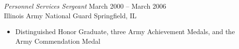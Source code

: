\documentclass[margin,line]{resume}
\begin{document}
\begin{resume}
{\sl Personnel Services Sergeant} \hfill
     March 2000 -- March 2006\\
     Illinois Army National Guard \hfill
     Springfield, IL
\begin{itemize} \itemsep -2pt %
\small\item Distinguished Honor Graduate, three Army Achievement Medals, and the Army Commendation Medal
\end{itemize}
\vspace{4pt}


\end{resume}
\end{document}
